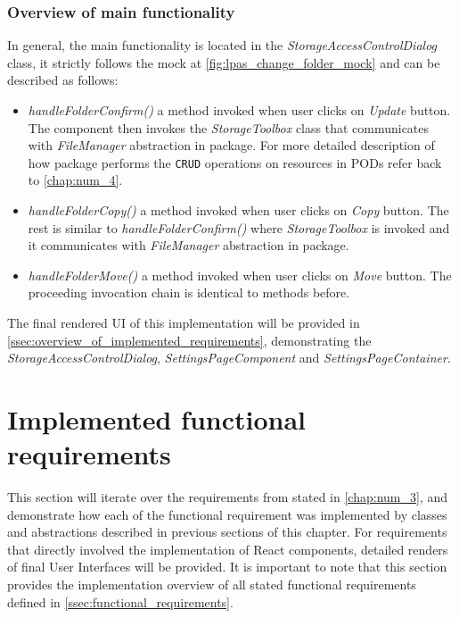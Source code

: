 \subsubsection{Overview of main functionality}

In general, the main functionality is located in the \textit{StorageAccessControlDialog} class, it strictly follows the mock at \autoref{fig:lpas_change_folder_mock} and can be described as follows:
\begin{itemize}
    \item \textit{handleFolderConfirm()} a method invoked when user clicks on \textit{Update} button. The component then invokes the \textit{StorageToolbox} class that communicates with \textit{FileManager} abstraction in \lpas{} package. For more detailed description of how \lpas{} package performs the \texttt{CRUD} operations on resources in \solid{} PODs refer back to \autoref{chap:num_4}.
    \item \textit{handleFolderCopy()} a method invoked when user clicks on \textit{Copy} button. The rest is similar to \textit{handleFolderConfirm()} where \textit{StorageToolbox} is invoked and it communicates with \textit{FileManager} abstraction in \lpas{} package. 
    \item \textit{handleFolderMove()} a method invoked when user clicks on \textit{Move} button. The proceeding invocation chain is identical to methods before.
\end{itemize}

The final rendered UI of this implementation will be provided in \autoref{ssec:overview_of_implemented_requirements}, demonstrating the \textit{StorageAccessControlDialog}, \textit{SettingsPageComponent} and \textit{SettingsPageContainer}.

\section{Implemented functional requirements}
\label{ssec:overview_of_implemented_requirements}

This section will iterate over the requirements from \lpa{} stated in \autoref{chap:num_3}, and demonstrate how each of the functional requirement was implemented by classes and abstractions described in previous sections of this chapter. For requirements that directly involved the implementation of React components, detailed renders of final User Interfaces will be provided. It is important to note that this section provides the implementation overview of all stated functional requirements defined in \autoref{ssec:functional_requirements}.

